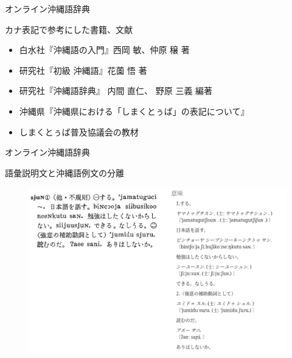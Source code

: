 \documentclass[14pt]{beamer}
\begin{document}
\begin{frame}{オンライン沖縄語辞典}
  \begin{block}{カナ表記で参考にした書籍、文献}
    \vspace{0pt}
    \begin{itemize}
    \item 白水社『沖縄語の入門』西岡 敏、仲原 穣 著
    \item 研究社『初級 沖縄語』花薗 悟 著
    \item 研究社『沖縄語辞典』 内間 直仁、 野原 三義 編著
    \item 沖縄県『沖縄県における「しまくとぅば」の表記について』
    \item しまくとぅば普及協議会の教材
    \end{itemize}
  \end{block}
\end{frame}



\begin{frame}{オンライン沖縄語辞典}
  \begin{block}{語彙説明文と沖縄語例文の分離}
    \begin{figure}[ht]
      \centering
      \begin{minipage}{\paperwidth}
        \includegraphics[height=0.6\paperheight,width=0.7\paperwidth]{okinawago-app-explanation-example.png}
      \end{minipage}
    \end{figure}
  \end{block}
\end{frame}
\end{document}
